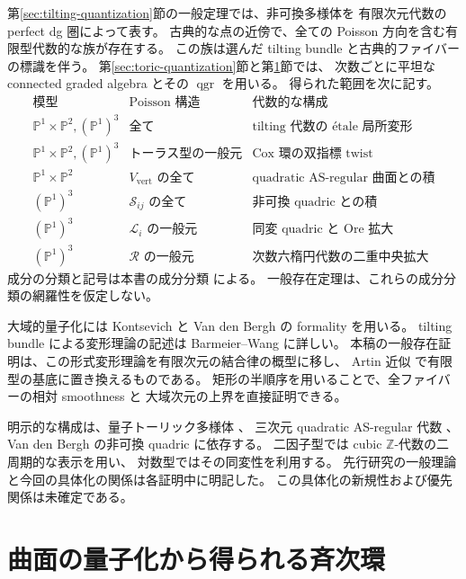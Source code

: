 \documentclass[11pt,a4paper]{ltjsarticle}
\theoremstyle{definition}
\newcommand{\PP}{\mathbb P}
\begin{document}
第\ref{sec:tilting-quantization}節の一般定理では、非可換多様体を
有限次元代数の perfect dg 圏によって表す。
古典的な点の近傍で、全ての Poisson 方向を含む有限型代数的な族が存在する。
この族は選んだ tilting bundle と古典的ファイバーの標識を伴う。
第\ref{sec:toric-quantization}節と第\ref{sec:surface-quantization}節では、
次数ごとに平坦な connected graded algebra とその $\operatorname{qgr}$ を用いる。
得られた範囲を次に記す。
\[
\begin{array}{c|c|l}
\text{模型}&\text{Poisson 構造}&\text{代数的な構成}\\\hline
\PP^1\times\PP^2, (\PP^1)^3&\text{全て}&
     \text{tilting 代数の \'etale 局所変形}\\
\PP^1\times\PP^2, (\PP^1)^3&\text{トーラス型の一般元}&
     \text{Cox 環の双指標 twist}\\
\PP^1\times\PP^2&V_{\mathrm{vert}}\text{ の全て}&
     \text{quadratic AS-regular 曲面との積}\\
(\PP^1)^3&\mathcal S_{ij}\text{ の全て}&
     \text{非可換 quadric との積}\\
(\PP^1)^3&\mathcal L_i\text{ の一般元}&
     \text{同変 quadric と Ore 拡大}\\
(\PP^1)^3&\mathcal R\text{ の一般元}&
     \text{次数六楕円代数の二重中央拡大}
\end{array}
\]
成分の分類と記号は本書の成分分類 による。
一般存在定理は、これらの成分分類の網羅性を仮定しない。

大域的量子化には Kontsevich \cite{KontsevichAlgebraic} と
Van den Bergh \cite{VdBGlobal} の formality を用いる。
tilting bundle による変形理論の記述は
Barmeier--Wang \cite[\S3.2]{BW2024} に詳しい。
本稿の一般存在証明は、この形式変形理論を有限次元の結合律の概型に移し、
Artin 近似 \cite{StacksArtin} で有限型の基底に置き換えるものである。
矩形の半順序を用いることで、全ファイバーの相対 smoothness と
大域次元の上界を直接証明できる。

明示的な構成は、量子トーリック多様体 \cite{CLS}、
三次元 quadratic AS-regular 代数 \cite{MoriSmith}、
Van den Bergh の非可換 quadric \cite{VdBQuadrics} に依存する。
二因子型では cubic $\mathbb Z$-代数の二周期的な表示を用い、
対数型ではその同変性を利用する。
先行研究の一般理論と今回の具体化の関係は各証明中に明記した。
この具体化の新規性および優先関係は未確定である。





\section{曲面の量子化から得られる斉次環}
\label{sec:surface-quantization}

\end{document}
